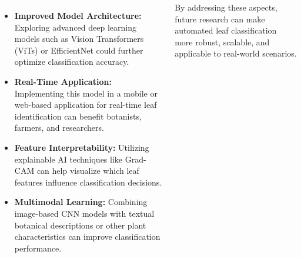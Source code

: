 \documentclass[20pt,margin=1in,innermargin=-4.5in,blockverticalspace=-0.25in]{tikzposter}
\begin{document}
\begin{columns}
{\begin{itemize}
     \item \textbf{Improved Model Architecture:} Exploring advanced deep learning models such as Vision Transformers (ViTs) or EfficientNet could further optimize classification accuracy.

 \item \textbf{Real-Time Application:}  Implementing this model in a mobile or web-based application for real-time leaf identification can benefit botanists, farmers, and researchers.

 \item \textbf{Feature Interpretability:} Utilizing explainable AI techniques like Grad-CAM can help visualize which leaf features influence classification decisions.

  \item \textbf{Multimodal Learning:} Combining image-based CNN models with textual botanical descriptions or other plant characteristics can improve classification performance.

    \end{itemize}
    }

    By addressing these aspects, future research can make automated leaf classification more robust, scalable, and applicable to real-world scenarios.
    

\end{columns}
\end{document}
